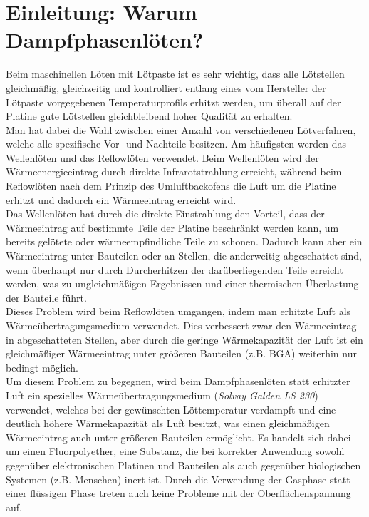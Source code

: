 \documentclass{\basedir/fablab-document}
\begin{document}
	\newpage
	\renewcommand{\contentsname}{Inhaltsverzeichnis / Arbeitsablauf}
	\setcounter{tocdepth}{2}
	\tableofcontents
	\newpage
	
	\section{Einleitung: Warum Dampfphasenl{\"o}ten?}
	
	Beim maschinellen L{\"o}ten mit L{\"o}tpaste ist es sehr wichtig, dass alle L{\"o}tstellen gleichm{\"a}{\ss}ig, gleichzeitig und kontrolliert entlang eines vom Hersteller der L{\"o}tpaste vorgegebenen Temperaturprofils erhitzt werden, um {\"u}berall auf der Platine gute L{\"o}tstellen gleichbleibend hoher Qualit{\"a}t zu erhalten. \\
	
	Man hat dabei die Wahl zwischen einer Anzahl von verschiedenen L{\"o}tverfahren, welche alle spezifische Vor- und Nachteile besitzen. Am h{\"a}ufigsten werden das Wellenl{\"o}ten und das Reflowl{\"o}ten verwendet. Beim Wellenl{\"o}ten wird der W{\"a}rmeenergieeintrag durch direkte Infrarotstrahlung erreicht, w{\"a}hrend beim Reflowl{\"o}ten nach dem Prinzip des Umluftbackofens die Luft um die Platine erhitzt und dadurch ein W{\"a}rmeeintrag erreicht wird.\\
	
	Das Wellenl{\"o}ten hat durch die direkte Einstrahlung den Vorteil, dass der W{\"a}rmeeintrag auf bestimmte Teile der Platine beschr{\"a}nkt werden kann, um bereits gel{\"o}tete oder w{\"a}rmeempfindliche Teile zu schonen. Dadurch kann aber ein W{\"a}rmeeintrag unter Bauteilen oder an Stellen, die anderweitig abgeschattet sind, wenn {\"u}berhaupt nur durch Durcherhitzen der dar{\"u}berliegenden Teile erreicht werden, was zu ungleichm{\"a}{\ss}igen Ergebnissen und einer thermischen {\"U}berlastung der Bauteile f{\"u}hrt.\\
	
	Dieses Problem wird beim Reflowl{\"o}ten umgangen, indem man erhitzte Luft als W{\"a}rme{\"u}bertragungsmedium verwendet. Dies verbessert zwar den W{\"a}rmeeintrag in abgeschatteten Stellen, aber durch die geringe W{\"a}rmekapazit{\"a}t der Luft ist ein gleichm{\"a}{\ss}iger W{\"a}rmeeintrag unter gr{\"o}{\ss}eren Bauteilen (z.B. BGA) weiterhin nur bedingt m{\"o}glich.\\
	
	Um diesem Problem zu begegnen, wird beim Dampfphasenl{\"o}ten statt erhitzter Luft ein spezielles W{\"a}rme{\"u}bertragungsmedium (\textit{Solvay Galden LS 230}) verwendet, welches bei der gew{\"u}nschten L{\"o}ttemperatur verdampft und eine deutlich h{\"o}here W{\"a}rmekapazit{\"a}t als Luft besitzt, was einen gleichm{\"a}{\ss}igen W{\"a}rmeeintrag auch unter gr{\"o}{\ss}eren Bauteilen erm{\"o}glicht. Es handelt sich dabei um einen Fluorpolyether, eine Substanz, die bei korrekter Anwendung sowohl gegen{\"u}ber elektronischen Platinen und Bauteilen als auch gegen{\"u}ber biologischen Systemen (z.B. Menschen) inert ist. Durch die Verwendung der Gasphase statt einer fl{\"u}ssigen Phase treten auch keine Probleme mit der Oberfl{\"a}chenspannung auf.
	
\end{document}
